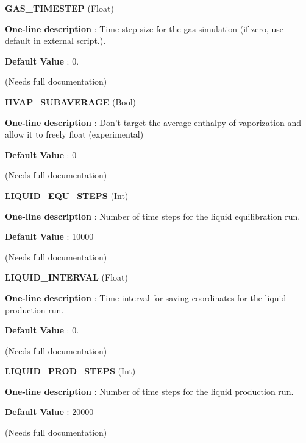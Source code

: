 \begin{DoxyItemize}
\item {\bfseries  \-G\-A\-S\-\_\-\-T\-I\-M\-E\-S\-T\-E\-P } (\-Float) \par
{\bfseries  \-One-\/line description }\-: \-Time step size for the gas simulation (if zero, use default in external script.). \par
{\bfseries  \-Default \-Value }\-: 0. \par
(\-Needs full documentation)\end{DoxyItemize}
\begin{DoxyItemize}
\item {\bfseries  \-H\-V\-A\-P\-\_\-\-S\-U\-B\-A\-V\-E\-R\-A\-G\-E } (\-Bool) \par
{\bfseries  \-One-\/line description }\-: \-Don't target the average enthalpy of vaporization and allow it to freely float (experimental) \par
{\bfseries  \-Default \-Value }\-: 0 \par
(\-Needs full documentation)\end{DoxyItemize}
\begin{DoxyItemize}
\item {\bfseries  \-L\-I\-Q\-U\-I\-D\-\_\-\-E\-Q\-U\-\_\-\-S\-T\-E\-P\-S } (\-Int) \par
{\bfseries  \-One-\/line description }\-: \-Number of time steps for the liquid equilibration run. \par
{\bfseries  \-Default \-Value }\-: 10000 \par
(\-Needs full documentation)\end{DoxyItemize}
\begin{DoxyItemize}
\item {\bfseries  \-L\-I\-Q\-U\-I\-D\-\_\-\-I\-N\-T\-E\-R\-V\-A\-L } (\-Float) \par
{\bfseries  \-One-\/line description }\-: \-Time interval for saving coordinates for the liquid production run. \par
{\bfseries  \-Default \-Value }\-: 0. \par
(\-Needs full documentation)\end{DoxyItemize}
\begin{DoxyItemize}
\item {\bfseries  \-L\-I\-Q\-U\-I\-D\-\_\-\-P\-R\-O\-D\-\_\-\-S\-T\-E\-P\-S } (\-Int) \par
{\bfseries  \-One-\/line description }\-: \-Number of time steps for the liquid production run. \par
{\bfseries  \-Default \-Value }\-: 20000 \par
(\-Needs full documentation)\end{DoxyItemize}
